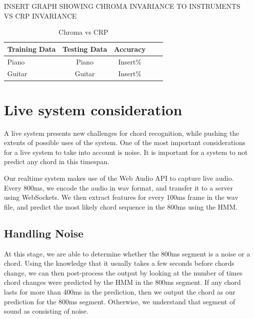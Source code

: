 \documentclass{article}
\begin{document}
INSERT GRAPH SHOWING CHROMA INVARIANCE TO INSTRUMENTS VS CRP INVARIANCE

\begin{table}[t]
\caption{Chroma vs CRP}
\label{chromavscrp}
\vskip 0.15in
\begin{center}
\begin{small}
\begin{sc}
\begin{tabular}{lcccr}
\hline
\abovespace\belowspace
Training Data & Testing Data & Accuracy \\
\hline
\abovespace
Piano  & Piano  & Insert\%\\
Guitar & Guitar  & Insert\%\\
\hline
\end{tabular}
\end{sc}
\end{small}
\end{center}
\vskip -0.1in
\end{table}


\section{Live system consideration}

A live system presents new challenges for chord recognition, while pushing the extents of possible uses of the system.
One of the most important considerations for a live system to take into account is noise. It is important for a system to not predict any chord in this timespan. 

Our realtime system makes use of the Web Audio API to capture live audio. Every 800ms, we encode the audio in wav format, and transfer it to a server using WebSockets. We then extract features for every 100ms frame in the wav file, and predict the most likely chord sequence in the 800ms using the HMM.

\subsection{Handling Noise}
At this stage, we are able to determine whether the 800ms segment is a noise or a chord. Using the knowledge that it usually takes a few seconds before chords change, we can then post-process the output by looking at the number of times chord changes were predicted by the HMM in the 800ms segment. If any chord lasts for more than 400ms in the prediction, then we output the chord as our prediction for the 800ms segment. Otherwise, we understand that segment of sound as consisting of noise.
\end{document}
